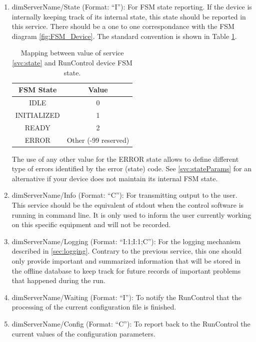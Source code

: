\documentclass[a4paper]{article}
\begin{document}
\begin{enumerate}[label=\textbf{SVC.\arabic*}]
	\item \label{svc:state} dimServerName/State (Format: ``I''): For FSM state reporting. If the device
	is internally keeping track of its internal state, this state should be reported in this service. There should
	be a one to one correspondance with the FSM diagram \ref{fig:FSM_Device}. The standard convention
	is shown in Table \ref{table:FSMStates}.
	\begin{table}
		\center
		\begin{tabular}{c|c}
			FSM State & Value\\
			\hline
			IDLE & 0\\
			INITIALIZED & 1\\
			READY & 2\\
			ERROR & Other (-99 reserved)\\
			\hline
		\end{tabular}
		\caption{Mapping between value of service \ref{svc:state} and RunControl device FSM state.}
		\label{table:FSMStates}
	\end{table}
	The use of any other value for the ERROR state allows to define different type of errors identified
	by the error (state) code. See \ref{svc:stateParams} for an alternative if your device does not
	maintain its internal FSM state.
	\item \label{svc:info} dimServerName/Info (Format: ``C''): For transmitting output to the user. This
	service should be the equivalent of stdout when the control software is running in command line. It is only used
	to inform the user currently working on this specific equipment and will not be recorded.
	\item \label{svc:logging} dimServerName/Logging (Format: ``I:1;I:1;C''): For the logging mechanism
	described in \ref{sec:logging}. Contrary to the previous service, this one should only provide important and
	summarized information that will be stored in the offline database to keep track for future records
	of important problems that happened during the run.
	\item \label{svc:waiting} dimServerName/Waiting (Format: ``I''): To notify the RunControl that the
	processing of the current configuration file is finished.
	\item \label{svc:config} dimServerName/Config (Format: ``C''): To report back to the RunControl the
	current values of the configuration parameters.
\end{enumerate}
\end{document}
